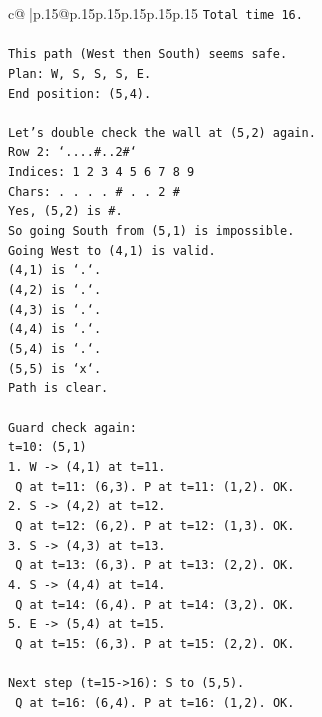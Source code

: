 \documentclass{article}
\begin{document}
{\begin{supertabular}{c@{$\;$}|p{.15\linewidth}@{}p{.15\linewidth}p{.15\linewidth}p{.15\linewidth}p{.15\linewidth}p{.15\linewidth}}
{{{\texttt{Total time 16.} \\
\\ 
\texttt{This path (West then South) seems safe.} \\
\texttt{Plan: W, S, S, S, E.} \\
\texttt{End position: (5,4).} \\
\\ 
\texttt{Let's double check the wall at (5,2) again.} \\
\texttt{Row 2: `....\#..2\#`} \\
\texttt{Indices: 1 2 3 4 5 6 7 8 9} \\
\texttt{Chars: . . . . \# . . 2 \#} \\
\texttt{Yes, (5,2) is \#.} \\
\texttt{So going South from (5,1) is impossible.} \\
\texttt{Going West to (4,1) is valid.} \\
\texttt{(4,1) is `.`.} \\
\texttt{(4,2) is `.`.} \\
\texttt{(4,3) is `.`.} \\
\texttt{(4,4) is `.`.} \\
\texttt{(5,4) is `.`.} \\
\texttt{(5,5) is `x`.} \\
\texttt{Path is clear.} \\
\\ 
\texttt{Guard check again:} \\
\texttt{t=10: (5,1)} \\
\texttt{1. W {-}> (4,1) at t=11.} \\
\texttt{   Q at t=11: (6,3). P at t=11: (1,2). OK.} \\
\texttt{2. S {-}> (4,2) at t=12.} \\
\texttt{   Q at t=12: (6,2). P at t=12: (1,3). OK.} \\
\texttt{3. S {-}> (4,3) at t=13.} \\
\texttt{   Q at t=13: (6,3). P at t=13: (2,2). OK.} \\
\texttt{4. S {-}> (4,4) at t=14.} \\
\texttt{   Q at t=14: (6,4). P at t=14: (3,2). OK.} \\
\texttt{5. E {-}> (5,4) at t=15.} \\
\texttt{   Q at t=15: (6,3). P at t=15: (2,2). OK.} \\
\\ 
\texttt{Next step (t=15{-}>16): S to (5,5).} \\
\texttt{   Q at t=16: (6,4). P at t=16: (1,2). OK.} \\
}}}
\end{supertabular}}
\end{document}
